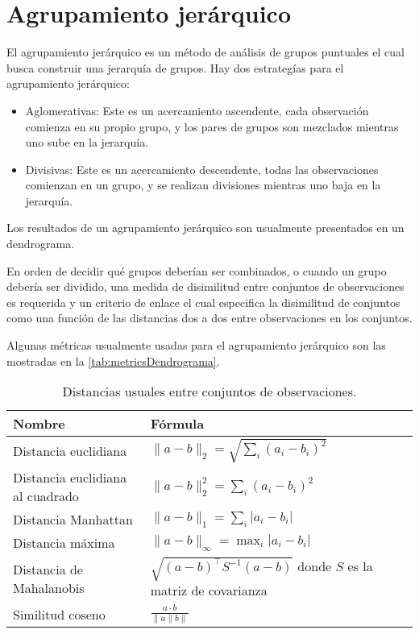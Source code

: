 \section{Agrupamiento jerárquico}
El agrupamiento jerárquico es un método de análisis de grupos puntuales el cual busca construir una jerarquía de grupos.
Hay dos estrategías para el agrupamiento jerárquico:
\begin{itemize}
	\item Aglomerativas: Este es un acercamiento ascendente, cada observación comienza en su propio grupo, y los pares de grupos son mezclados mientras uno sube en la jerarquía.
	\item Divisivas: Este es un acercamiento descendente, todas las observaciones comienzan en un grupo, y se realizan divisiones mientras uno baja en la jerarquía.
\end{itemize}

Los resultados de un agrupamiento jerárquico son usualmente presentados en un dendrograma. 

En orden de decidir qué grupos deberían ser combinados, o cuando un grupo debería ser dividido, una medida de disimilitud entre conjuntos de observaciones es requerida y un criterio de enlace el cual especifica la disimilitud de conjuntos como una función de las distancias dos a dos entre observaciones en los conjuntos.

Algunas métricas usualmente usadas para el agrupamiento jerárquico son las mostradas en la \autoref{tab:metricsDendrograma}.

\begin{table}[h]
	\centering
	\begin{tabular}{m{6cm} m{6cm}  }
		\toprule
		\textbf{Nombre} & \textbf{Fórmula}\\
		\midrule
		 Distancia euclidiana & $\|a-b\|_{2}=\sqrt{\sum_{i}\left(a_{i}-b_{i}\right)^{2}}$\\
		\hline 
		Distancia euclidiana al cuadrado & $\|a-b\|_{2}^{2}=\sum_{i}\left(a_{i}-b_{i}\right)^{2}$ \\
		\hline 
		Distancia Manhattan & $\|a-b\|_{1}=\sum_{i}\left|a_{i}-b_{i}\right|$ \\
		\hline 
		Distancia máxima & $\|a-b\|_{\infty}=\max _{i}\left|a_{i}-b_{i}\right|$ \\
		\hline 
		Distancia de Mahalanobis & $\sqrt{(a-b)^{\top} S^{-1}(a-b)}$ donde $S$ es la matriz de covarianza \\
		\hline 
		Similitud coseno & $\frac{a \cdot b}{\|a\| b \|}$ \\
		\bottomrule
		\hline
	\end{tabular}
	\caption{Distancias usuales entre conjuntos de observaciones.}
	\label{tab:metricsDendrograma}
\end{table}



